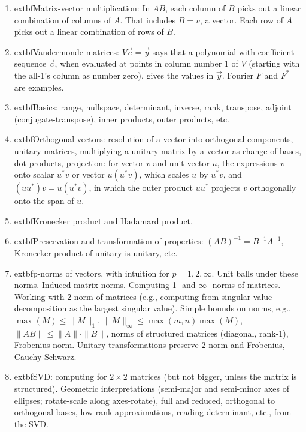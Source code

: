 \documentclass[lang=cn,11pt]{elegantbook}
\begin{document}
\begin{enumerate}
    \item 	extbf{Matrix-vector multiplication}: In $AB$, each column of $B$ picks out a linear combination of columns of $A$. That includes $B = v$, a vector. Each row of $A$ picks out a linear combination of rows of $B$.
    
    \item 	extbf{Vandermonde matrices}: $V\vec{c} = \vec{y}$ says that a polynomial with coefficient sequence $\vec{c}$, when evaluated at points in column number 1 of $V$ (starting with the all-1’s column as number zero), gives the values in $\vec{y}$. Fourier $F$ and $F^*$ are examples.
    
    \item 	extbf{Basics}: range, nullspace, determinant, inverse, rank, transpose, adjoint (conjugate-transpose), inner products, outer products, etc.
    
    \item 	extbf{Orthogonal vectors}: resolution of a vector into orthogonal components, unitary matrices, multiplying a unitary matrix by a vector as change of bases, dot products, projection: for vector $v$ and unit vector $u$, the expressions $v$ onto scalar $u^*v$ or vector $u(u^*v)$, which scales $u$ by $u^*v$, and $(uu^*)v = u(u^*v)$, in which the outer product $uu^*$ projects $v$ orthogonally onto the span of $u$.
    
    \item 	extbf{Kronecker product and Hadamard product}.
    
    \item 	extbf{Preservation and transformation of properties}: $(AB)^{-1} = B^{-1}A^{-1}$, Kronecker product of unitary is unitary, etc.
    
    \item 	extbf{p-norms of vectors}, with intuition for $p = 1, 2, \infty$. Unit balls under these norms. Induced matrix norms. Computing 1- and $\infty$- norms of matrices. Working with 2-norm of matrices (e.g., computing from singular value decomposition as the largest singular value). Simple bounds on norms, e.g., $\max(M) \leq \|M\|_1$, $\|M\|_{\infty} \leq \max(m,n)\max(M)$, $\|AB\| \leq \|A\| \cdot \|B\|$, norms of structured matrices (diagonal, rank-1), Frobenius norm. Unitary transformations preserve 2-norm and Frobenius, Cauchy-Schwarz.
    
    \item 	extbf{SVD}: computing for $2\times2$ matrices (but not bigger, unless the matrix is structured). Geometric interpretations (semi-major and semi-minor axes of ellipses; rotate-scale along axes-rotate), full and reduced, orthogonal to orthogonal bases, low-rank approximations, reading determinant, etc., from the SVD.
    

\end{enumerate}
\end{document}
